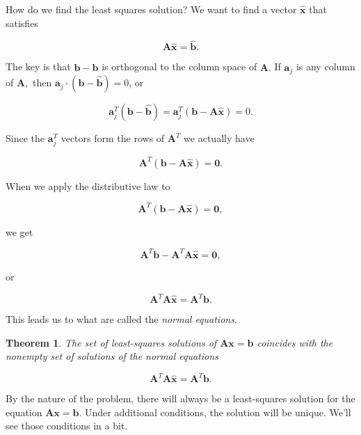 \documentclass[
]{book}
\newtheorem{theorem}{Theorem}[chapter]
\theoremstyle{definition}
\theoremstyle{definition}
\theoremstyle{definition}
\theoremstyle{definition}
\theoremstyle{remark}
\begin{document}
How do we find the least squares solution? We want to find a vector \(\hat{\mathbf{x}}\) that satisfies

\[\mathbf{A}\hat{\mathbf{x}}=\hat{\mathbf{b}}.\]

The key is that \(\mathbf{b}-\hat{\mathbf{b}}\) is orthogonal to the column space of \(\mathbf{A}.\) If \(\mathbf{a}_j\) is any column of \(\mathbf{A},\) then \(\mathbf{a}_j\cdot(\mathbf{b}-\hat{\mathbf{b}})=0\), or

\[\mathbf{a}_j^T (\mathbf{b}-\hat{\mathbf{b}})=\mathbf{a}_j^T (\mathbf{b}-\mathbf{A}\hat{\mathbf{x}})=0.\]

Since the \(\mathbf{a}_j^T\) vectors form the rows of \(\mathbf{A}^T\) we actually have

\[\mathbf{A}^T(\mathbf{b}-\mathbf{A}\hat{\mathbf{x}})=\mathbf{0}.\]

When we apply the distributive law to

\[\mathbf{A}^T(\mathbf{b}-\mathbf{A}\hat{\mathbf{x}})=\mathbf{0},\]

we get

\[\mathbf{A}^T\mathbf{b}-\mathbf{A}^T\mathbf{A}\hat{\mathbf{x}}=\mathbf{0},\]

or

\[\mathbf{A}^T\mathbf{A}\hat{\mathbf{x}}=\mathbf{A}^T\mathbf{b}.\]

This leads us to what are called the \emph{normal equations}.

\begin{theorembox}

\begin{theorem}
\protect\hypertarget{thm:NormalEq}{}\label{thm:NormalEq}The set of least-squares solutions of \(\mathbf{A}\mathbf{x}=\mathbf{b}\) coincides with the nonempty set of solutions of the normal equations

\[\mathbf{A}^T\mathbf{A}\hat{\mathbf{x}}=\mathbf{A}^T\mathbf{b}.\]
\end{theorem}

\end{theorembox}

By the nature of the problem, there will always be a least-squares solution for the equation \(\mathbf{A}\mathbf{x}=\mathbf{b}\). Under additional conditions, the solution will be unique. We'll see those conditions in a bit.
\end{document}
